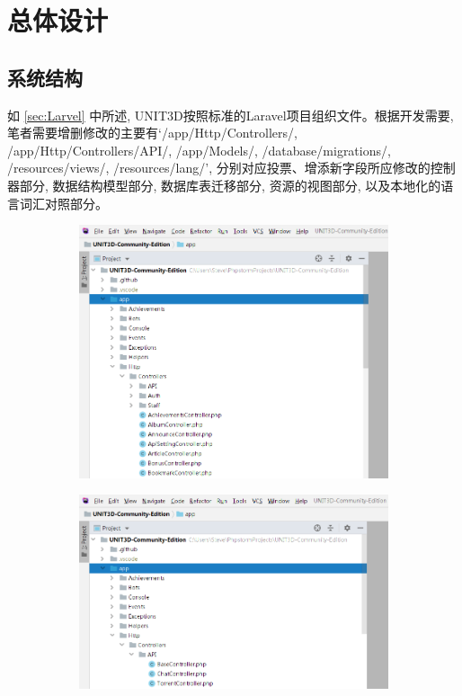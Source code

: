 \chapter{总体设计}
\label{cha:design}

\section{系统结构}

如 \ref{sec:Larvel} 中所述, UNIT3D按照标准的Laravel项目组织文件。根据开发需要, 笔者需要增删修改的主要有`/app/Http/Controllers/, /app/Http/Controllers/API/, /app/Models/, /database/migrations/, /resources/views/, /resources/lang/', 分别对应投票、增添新字段所应修改的控制器部分, 数据结构模型部分, 数据库表迁移部分, 资源的视图部分, 以及本地化的语言词汇对照部分。

\begin{figure}[!ht]
	\centering
    \begin{subfigure}{0.3\textwidth}
		\centering
		\includegraphics[width=\textwidth]{support-files/3.1-phpstorm-folder-structure-1.png}
		\caption{ }
		\label{fig:torrent_in_bencode}
	\end{subfigure} 
	\makebox[0.05\textwidth]{}
    \begin{subfigure}{0.3\textwidth}
		\centering
		\includegraphics[width=\textwidth]{support-files/3.1-phpstorm-folder-structure-2.png}

\end{subfigure}
\end{figure}
